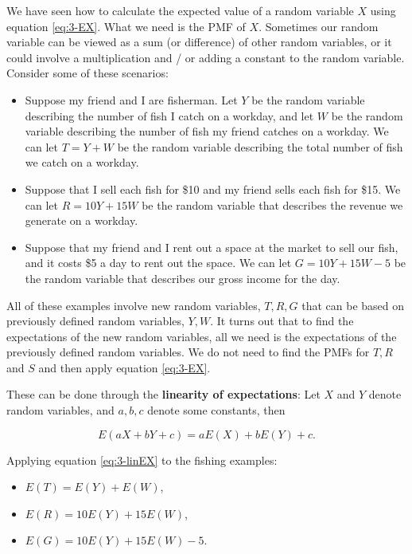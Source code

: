 \documentclass[
]{book}
\providecommand{\tightlist}{%
  \setlength{\itemsep}{0pt}\setlength{\parskip}{0pt}}
\begin{document}
We have seen how to calculate the expected value of a random variable \(X\) using equation \eqref{eq:3-EX}. What we need is the PMF of \(X\). Sometimes our random variable can be viewed as a sum (or difference) of other random variables, or it could involve a multiplication and / or adding a constant to the random variable. Consider some of these scenarios:

\begin{itemize}
\item
  Suppose my friend and I are fisherman. Let \(Y\) be the random variable describing the number of fish I catch on a workday, and let \(W\) be the random variable describing the number of fish my friend catches on a workday. We can let \(T = Y+W\) be the random variable describing the total number of fish we catch on a workday.
\item
  Suppose that I sell each fish for \$10 and my friend sells each fish for \$15. We can let \(R = 10Y + 15W\) be the random variable that describes the revenue we generate on a workday.
\item
  Suppose that my friend and I rent out a space at the market to sell our fish, and it costs \$5 a day to rent out the space. We can let \(G = 10Y + 15W - 5\) be the random variable that describes our gross income for the day.
\end{itemize}

All of these examples involve new random variables, \(T, R, G\) that can be based on previously defined random variables, \(Y, W\). It turns out that to find the expectations of the new random variables, all we need is the expectations of the previously defined random variables. We do not need to find the PMFs for \(T, R\) and \(S\) and then apply equation \eqref{eq:3-EX}.

These can be done through the \textbf{linearity of expectations}: Let \(X\) and \(Y\) denote random variables, and \(a,b,c\) denote some constants, then

\begin{equation} 
E(aX + bY +c) = aE(X) + bE(Y) + c.
\label{eq:3-linEX}
\end{equation}

Applying equation \eqref{eq:3-linEX} to the fishing examples:

\begin{itemize}
\tightlist
\item
  \(E(T) = E(Y) + E(W)\),
\item
  \(E(R) = 10E(Y) + 15E(W)\),
\item
  \(E(G) = 10E(Y) + 15E(W) - 5\).
\end{itemize}
\end{document}
